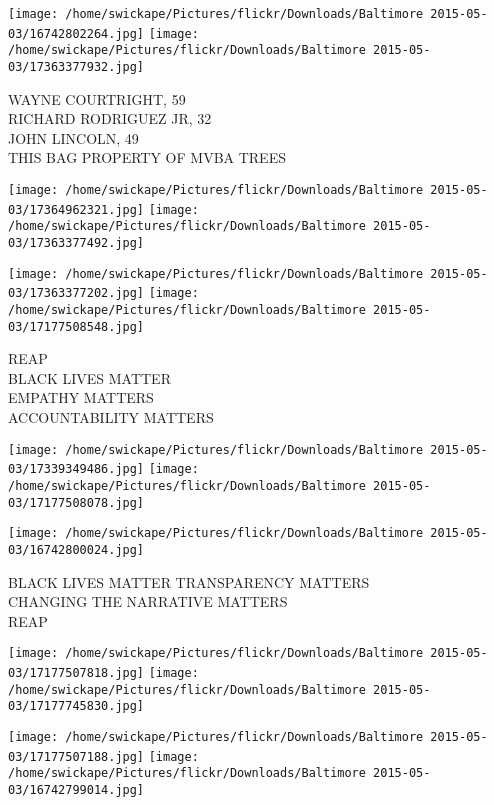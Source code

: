 \documentclass[10pt,letterpaper]{article}
\begin{document}
\texttt{[image: /home/swickape/Pictures/flickr/Downloads/Baltimore 2015-05-03/16742802264.jpg]}
\texttt{[image: /home/swickape/Pictures/flickr/Downloads/Baltimore 2015-05-03/17363377932.jpg]}

WAYNE COURTRIGHT, 59\\
RICHARD RODRIGUEZ JR, 32\\
JOHN LINCOLN, 49\\
THIS BAG PROPERTY OF MVBA TREES\\
\pagebreak

\texttt{[image: /home/swickape/Pictures/flickr/Downloads/Baltimore 2015-05-03/17364962321.jpg]}
\texttt{[image: /home/swickape/Pictures/flickr/Downloads/Baltimore 2015-05-03/17363377492.jpg]}

\texttt{[image: /home/swickape/Pictures/flickr/Downloads/Baltimore 2015-05-03/17363377202.jpg]}
\texttt{[image: /home/swickape/Pictures/flickr/Downloads/Baltimore 2015-05-03/17177508548.jpg]}

REAP\\
BLACK LIVES MATTER\\
EMPATHY MATTERS\\
ACCOUNTABILITY MATTERS\\
\pagebreak

\texttt{[image: /home/swickape/Pictures/flickr/Downloads/Baltimore 2015-05-03/17339349486.jpg]}
\texttt{[image: /home/swickape/Pictures/flickr/Downloads/Baltimore 2015-05-03/17177508078.jpg]}

\vspace{0.25in}
\texttt{[image: /home/swickape/Pictures/flickr/Downloads/Baltimore 2015-05-03/16742800024.jpg]}

BLACK LIVES MATTER TRANSPARENCY MATTERS\\
CHANGING THE NARRATIVE MATTERS\\
REAP\\
\pagebreak

\texttt{[image: /home/swickape/Pictures/flickr/Downloads/Baltimore 2015-05-03/17177507818.jpg]}
\texttt{[image: /home/swickape/Pictures/flickr/Downloads/Baltimore 2015-05-03/17177745830.jpg]}

\texttt{[image: /home/swickape/Pictures/flickr/Downloads/Baltimore 2015-05-03/17177507188.jpg]}
\texttt{[image: /home/swickape/Pictures/flickr/Downloads/Baltimore 2015-05-03/16742799014.jpg]}
\end{document}
